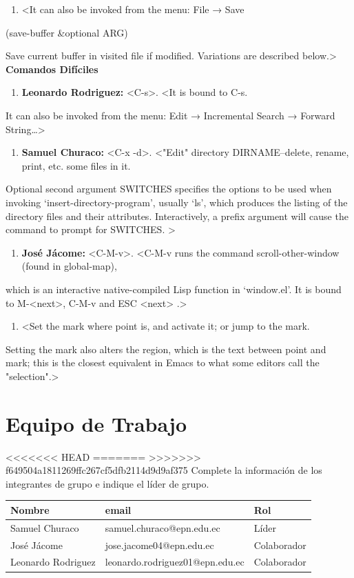 \documentclass{article}
\begin{document}
\begin{center}
\begin{enumerate}
\item <C-x C-s> <It can also be invoked from the menu: File → Save
\end{enumerate}

(save-buffer \&optional ARG)

Save current buffer in visited file if modified.
Variations are described below.>
\textbf{\textbf{Comandos Difíciles}}
\begin{enumerate}
\item \textbf{\textbf{Leonardo Rodriguez:}} <C-s>. <It is bound to C-s.
\end{enumerate}
It can also be invoked from the menu: Edit → Incremental Search →
Forward String\ldots{}>
\begin{enumerate}
\item \textbf{\textbf{Samuel Churaco:}} <C-x -d>. <"Edit" directory DIRNAME--delete, rename, print, etc. some files in it.
\end{enumerate}
Optional second argument SWITCHES specifies the options to be used
when invoking ‘insert-directory-program’, usually ‘ls’, which produces
the listing of the directory files and their attributes.
Interactively, a prefix argument will cause the command to prompt
for SWITCHES.
>
\begin{enumerate}
\item \textbf{\textbf{José Jácome:}} <C-M-v>. <C-M-v runs the command scroll-other-window (found in global-map),
\end{enumerate}
which is an interactive native-compiled Lisp function in ‘window.el’.
It is bound to M-<next>, C-M-v and ESC <next> .>
\begin{enumerate}
\item <C-x b> <Set the mark where point is, and activate it; or jump to the mark.
\end{enumerate}
Setting the mark also alters the region, which is the text
between point and mark; this is the closest equivalent in
Emacs to what some editors call the "selection".>
\section{Equipo de Trabajo}
<<<<<<< HEAD
\label{sec:org945921b}
=======
\label{sec:org905128a}
>>>>>>> f649504a1811269ffc267cf5dfb2114d9d9af375
Complete la información de los integrantes de grupo e indique el líder
de grupo.

\begin{center}
\begin{tabular}{lll}
\hline
Nombre & email & Rol\\[0pt]
\hline
Samuel Churaco & samuel.churaco@epn.edu.ec & Líder\\[0pt]
José Jácome & jose.jacome04@epn.edu.ec & Colaborador\\[0pt]
Leonardo Rodriguez & leonardo.rodriguez01@epn.edu.ec & Colaborador\\[0pt]
\hline
\end{tabular}
\end{center}


\end{center}
\end{document}
